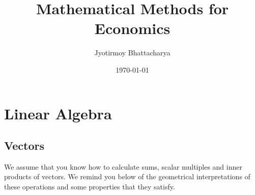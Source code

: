 \documentclass[11pt,reqno,openany]{amsbook}
\title{Mathematical Methods for Economics}
\author{Jyotirmoy Bhattacharya}
\date{\today}
\numberwithin{figure}{chapter}
\numberwithin{equation}{chapter}
\theoremstyle{plain}
\theoremstyle{definition}
\begin{document}
\frontmatter
\maketitle
\tableofcontents

\mainmatter
\chapter{Linear Algebra}
\section{Vectors}
We assume that you know how to calculate sums, scalar multiples and
inner products of vectors. We remind you below of the geometrical
interpretations of these operations and some properties that they
satisfy.
\end{document}

